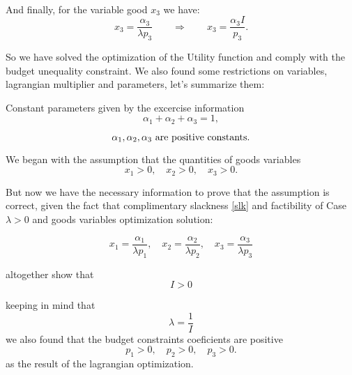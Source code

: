 \documentclass{article}
\begin{document}
\paragraph{}
And finally, for the variable good $x_3$ we have:
\begin{equation}
  x_3 = \frac{\alpha_3}{\lambda p_3} \qquad \Rightarrow \qquad x_3 = \frac{\alpha_3 I}{ p_3}.
\end{equation}

So we have solved the optimization of the Utility function and comply with the budget unequality constraint. We also found some restrictions on variables, lagrangian multiplier and parameters, let's summarize them:

Constant parameters given by the excercise information
\begin{equation}
  \alpha_1 + \alpha_2 + \alpha_3 = 1,
\end{equation}

\begin{equation}
  \alpha_1, \alpha_2, \alpha_3 \text{  are positive constants.}\\
\end{equation}

\medskip

We began with the assumption that the quantities of goods variables
\begin{equation}
  x_1 > 0, \quad x_2 > 0, \quad x_3 > 0.
\end{equation}

But now we have the necessary information to prove that the assumption is correct, given the fact that complimentary slackness \ref{slk} and factibility of Case $\lambda > 0$ and goods variables optimization solution:

\begin{equation}
  x_1 = \frac{\alpha_1}{\lambda p_1}, \quad x_2 = \frac{\alpha_2}{\lambda p_2}, \quad x_3 = \frac{\alpha_3}{\lambda p_3}
\end{equation}

altogether show that
\begin{equation}
  I > 0
\end{equation}

keeping in mind that
\begin{equation}
  \lambda = \frac{1}{I}
\end{equation}
we also found that the budget constraints coeficients are positive
\begin{equation}
  p_1 > 0, \quad p_2 > 0, \quad  p_3 > 0.
\end{equation}
as the result of the lagrangian optimization.
\end{document}
